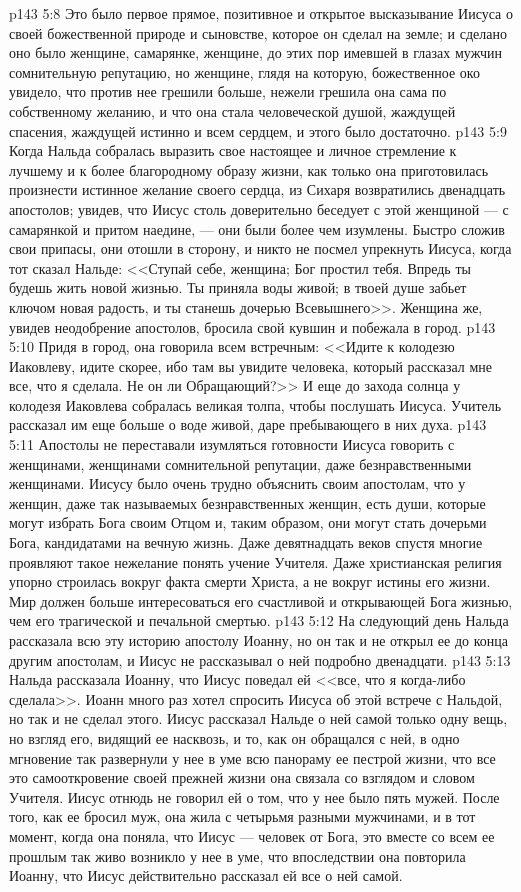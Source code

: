 \vs p143 5:8 Это было первое прямое, позитивное и открытое высказывание Иисуса о своей божественной природе и сыновстве, которое он сделал на земле; и сделано оно было женщине, самарянке, женщине, до этих пор имевшей в глазах мужчин сомнительную репутацию, но женщине, глядя на которую, божественное око увидело, что против нее грешили больше, нежели грешила она сама по собственному желанию, и что  она стала человеческой душой, жаждущей спасения, жаждущей истинно и всем сердцем, и этого было достаточно.
\vs p143 5:9 Когда Нальда собралась выразить свое настоящее и личное стремление к лучшему и к более благородному образу жизни, как только она приготовилась произнести истинное желание своего сердца, из Сихаря возвратились двенадцать апостолов; увидев, что Иисус столь доверительно беседует с этой женщиной --- с самарянкой и притом наедине, --- они были более чем изумлены. Быстро сложив свои припасы, они отошли в сторону, и никто не посмел упрекнуть Иисуса, когда тот сказал Нальде: <<Ступай себе, женщина; Бог простил тебя. Впредь ты будешь жить новой жизнью. Ты приняла воды живой; в твоей душе забьет ключом новая радость, и ты станешь дочерью Всевышнего>>. Женщина же, увидев неодобрение апостолов, бросила свой кувшин и побежала в город.
\vs p143 5:10 Придя в город, она говорила всем встречным: <<Идите к колодезю Иаковлеву, идите скорее, ибо там вы увидите человека, который рассказал мне все, что я сделала. Не он ли Обращающий?>> И еще до захода солнца у колодезя Иаковлева собралась великая толпа, чтобы послушать Иисуса. Учитель рассказал им еще больше о воде живой, даре пребывающего в них духа.
\vs p143 5:11 Апостолы не переставали изумляться готовности Иисуса говорить с женщинами, женщинами сомнительной репутации, даже безнравственными женщинами. Иисусу было очень трудно объяснить своим апостолам, что у женщин, даже так называемых безнравственных женщин, есть души, которые могут избрать Бога своим Отцом и, таким образом, они могут стать дочерьми Бога, кандидатами на вечную жизнь. Даже девятнадцать веков спустя многие проявляют такое нежелание понять учение Учителя. Даже христианская религия упорно строилась вокруг факта смерти Христа, а не вокруг истины его жизни. Мир должен больше интересоваться его счастливой и открывающей Бога жизнью, чем его трагической и печальной смертью.
\vs p143 5:12 На следующий день Нальда рассказала всю эту историю апостолу Иоанну, но он так и не открыл ее до конца другим апостолам, и Иисус не рассказывал о ней подробно двенадцати.
\vs p143 5:13 Нальда рассказала Иоанну, что Иисус поведал ей <<все, что я когда\hyp{}либо сделала>>. Иоанн много раз хотел спросить Иисуса об этой встрече с Нальдой, но так и не сделал этого. Иисус рассказал Нальде о ней самой только одну вещь, но взгляд его, видящий ее насквозь, и то, как он обращался с ней, в одно мгновение так развернули у нее в уме всю панораму ее пестрой жизни, что все это самооткровение своей прежней жизни она связала со взглядом и словом Учителя. Иисус отнюдь не говорил ей о том, что у нее было пять мужей. После того, как ее бросил муж, она жила с четырьмя разными мужчинами, и в тот момент, когда она поняла, что Иисус --- человек от Бога, это вместе со всем ее прошлым так живо возникло у нее в уме, что впоследствии она повторила Иоанну, что Иисус действительно рассказал ей все о ней самой.
